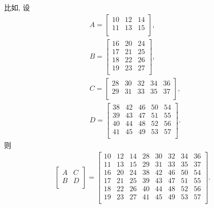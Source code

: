 比如, 设
\begin{align*}
     &
    A = \begin{bmatrix}
            10 & 12 & 14 \\
            11 & 13 & 15 \\
        \end{bmatrix},
    \\
     &
    B = \begin{bmatrix}
            16 & 20 & 24 \\
            17 & 21 & 25 \\
            18 & 22 & 26 \\
            19 & 23 & 27 \\
        \end{bmatrix},
    \\
     &
    C = \begin{bmatrix}
            28 & 30 & 32 & 34 & 36 \\
            29 & 31 & 33 & 35 & 37 \\
        \end{bmatrix},
    \\
     &
    D = \begin{bmatrix}
            38 & 42 & 46 & 50 & 54 \\
            39 & 43 & 47 & 51 & 55 \\
            40 & 44 & 48 & 52 & 56 \\
            41 & 45 & 49 & 53 & 57 \\
        \end{bmatrix}.
\end{align*}
则
\begin{align*}
    \begin{bmatrix}
        A & C \\
        B & D \\
    \end{bmatrix}
    =
    \begin{bmatrix}
        10 & 12 & 14 & 28 & 30 & 32 & 34 & 36 \\
        11 & 13 & 15 & 29 & 31 & 33 & 35 & 37 \\
        16 & 20 & 24 & 38 & 42 & 46 & 50 & 54 \\
        17 & 21 & 25 & 39 & 43 & 47 & 51 & 55 \\
        18 & 22 & 26 & 40 & 44 & 48 & 52 & 56 \\
        19 & 23 & 27 & 41 & 45 & 49 & 53 & 57 \\
    \end{bmatrix}.
\end{align*}

